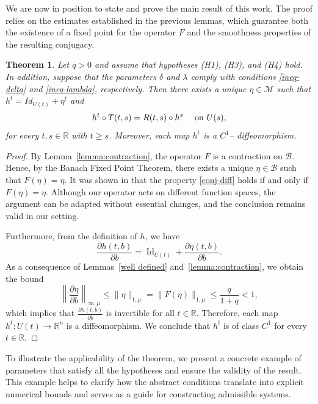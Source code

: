 \documentclass[9pt]{amsart}
\newtheorem{theorem}{Theorem}
\numberwithin{equation}{section}
\numberwithin{lemma}{section}
\begin{document}
We are now in position to state and prove the main result of this work. The proof relies on the estimates established in the previous lemmas, which guarantee both the existence of a fixed point for the operator $F$ and the smoothness properties of the resulting conjugacy.



\begin{theorem}
\label{Th-Diff}
   Let \(q > 0\) and assume that hypotheses \textnormal{(H1)}, \textnormal{(H3)}, and \textnormal{(H4)} hold. In addition, suppose that the parameters \(\delta\) and \(\lambda\) comply with conditions \eqref{ineq-delta} and \eqref{ineq-lambda}, respectively.
Then there exists a unique $\eta\in\mathcal{M}$ such that $h^{t}=Id_{U(t)}+\eta^t$ and 
    \begin{equation}\label{conj-diff}
        h^t\circ T(t,s) = R(t,s)\circ h^s \quad \textnormal{ on } U(s),
    \end{equation}
    for every $t, s\in\mathbb{R}$ with $t\geq s$. Moreover, each map $h^t$ is a $C^1$-- diffeomorphism.
\end{theorem}

\begin{proof}
By Lemma~\ref{lemma:contraction}, the operator \( F \) is a contraction on \( \mathcal{B} \). Hence, by the Banach Fixed Point Theorem, there exists a unique \( \eta \in \mathcal{B} \) such that \( F(\eta) = \eta \). It was shown in \cite[Lemma 2]{B-v-per} that the property \eqref{conj-diff} holds if and only if \( F(\eta) = \eta \). Although our operator acts on different function spaces, the argument can be adapted without essential changes, and the conclusion remains valid in our setting.

Furthermore, from the definition of \( h \), we have
\[
\frac{\partial h(t,b)}{\partial b} = \operatorname{Id}_{U(t)} + \frac{\partial \eta(t,b)}{\partial b}.
\]
As a consequence of Lemmas~\ref{well defined} and~\ref{lemma:contraction}, we obtain the bound
\[
\left\| \frac{\partial \eta}{\partial b} \right\|_{\infty,\mu}
\leq \| \eta \|_{1,\mu}
= \| F(\eta) \|_{1,\mu}
\leq \frac{q}{1+q} < 1,
\]
which implies that \( \frac{\partial h(t,b)}{\partial b} \) is invertible for all \( t \in \mathbb{R} \). Therefore, each map \( h^t \colon U(t) \to \mathbb{R}^n \) is a diffeomorphism. We conclude that \( h^t \) is of class \( C^1 \) for every \( t \in \mathbb{R} \).

\end{proof}

To illustrate the applicability of the theorem, we present a concrete example of parameters that satisfy all the hypotheses and ensure the validity of the result. This example helps to clarify how the abstract conditions translate into explicit numerical bounds and serves as a guide for constructing admissible systems.
\end{document}
